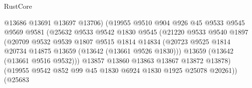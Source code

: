 \begin{lexlean}{RustCore}
\begin{coremodule}
                                    @13686
                                    @13691
                                    @13697
                                    @13706)
                                  (@19955
                                    @9510
                                    @904
                                    @926
                                    @45
                                    @9533
                                    @9545
                                    @9569
                                    @9581
                                    (@25632
                                      @9533
                                      @9542
                                      @1830
                                      @9545
                                      (@21220
                                        @9533
                                        @9540
                                        @1897
                                        (@20709
                                          @9532
                                          @9539
                                          @1807
                                          @9515
                                          @1814
                                          @14834
                                          (@20723
                                            @9525
                                            @1814
                                            @20734
                                            @14875
                                            @13659
                                            (@13642 (@13661 @9526 @1830)))
                                          @13659
                                          (@13642 (@13661 @9516 @9532)))
                                        @13857
                                        @13860
                                        @13863
                                        @13867
                                        @13872
                                        @13878)
                                      (@19955
                                        @9542
                                        @852
                                        @99
                                        @45
                                        @1830
                                        @6924
                                        @1830
                                        @1925
                                        @25078
                                        @20261))
                                    (@25683

\end{coremodule}
\end{lexlean}
